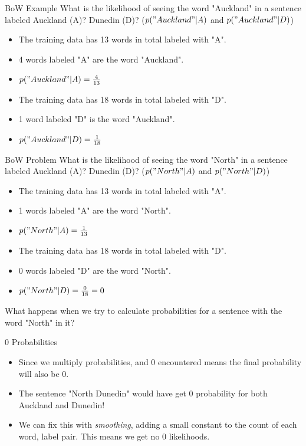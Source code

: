 \documentclass[aspectratio=169, 10pt]{beamer}
\begin{document}
\begin{frame}{BoW Example}
 What is the likelihood of seeing the word "Auckland" in a sentence labeled Auckland (A)? Dunedin (D)? ($p("Auckland"|A)$ and $p("Auckland"|D)$)
 \pause
 \begin{itemize}
     \item The training data has 13 words in total labeled with "A".
     \item 4 words labeled "A" are the word "Auckland".
     \item $p("Auckland"|A) = \frac{4}{13}$
     \pause
     \item The training data has 18 words in total labeled with "D".
     \item 1 word labeled "D" is the word "Auckland".
     \item $p("Auckland"|D) = \frac{1}{18}$
 \end{itemize}
\end{frame}

\begin{frame}{BoW Problem}
 What is the likelihood of seeing the word "North" in a sentence labeled Auckland (A)? Dunedin (D)? ($p("North"|A)$ and $p("North"|D)$)
 \pause
 \begin{itemize}
     \item The training data has 13 words in total labeled with "A".
     \item 1 words labeled "A" are the word "North".
     \item $p("North"|A) = \frac{1}{13}$
     \item The training data has 18 words in total labeled with "D".
     \item 0 words labeled "D" are the word "North".
     \item $p("North"|D) = \frac{0}{18} = 0$
 \end{itemize}
 What happens when we try to calculate probabilities for a sentence with the word "North" in it?
\end{frame}

\begin{frame}{0 Probabilities}
    \begin{itemize}
        \item Since we multiply probabilities, and 0 encountered means the final probability will also be 0.
        \item The sentence "North Dunedin" would have get 0 probability for both Auckland and Dunedin!
        \item We can fix this with \textit{smoothing}, adding a small constant to the count of each word, label pair. This means we get no 0 likelihoods.
    \end{itemize}
\end{frame}
\end{document}
